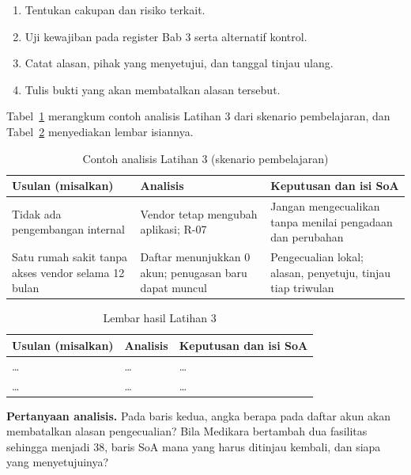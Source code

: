 \begin{enumerate}
  \item Tentukan cakupan dan risiko terkait.
  \item Uji kewajiban pada register Bab 3 serta alternatif kontrol.
  \item Catat alasan, pihak yang menyetujui, dan tanggal tinjau ulang.
  \item Tulis bukti yang akan membatalkan alasan tersebut.
\end{enumerate}

Tabel~\ref{tab:ch06-lat3-contoh} merangkum contoh analisis Latihan 3 dari skenario pembelajaran, dan
Tabel~\ref{tab:ch06-lat3-hasil} menyediakan lembar isiannya.

\begin{table}[!htb]
  \centering\small
  \caption{Contoh analisis Latihan 3 (skenario pembelajaran)}\label{tab:ch06-lat3-contoh}
  \begin{tabularx}{\textwidth}{|>{\raggedright\arraybackslash}X|>{\raggedright\arraybackslash}X|>{\raggedright\arraybackslash}X|}
    \hline
    \textbf{Usulan (misalkan)} & \textbf{Analisis} & \textbf{Keputusan dan isi SoA} \\ \hline
    Tidak ada pengembangan internal & Vendor tetap mengubah aplikasi; R-07 & Jangan mengecualikan tanpa
    menilai pengadaan dan perubahan \\ \hline
    Satu rumah sakit tanpa akses vendor selama 12 bulan & Daftar menunjukkan 0 akun; penugasan baru dapat
    muncul & Pengecualian lokal; alasan, penyetuju, tinjau tiap triwulan \\ \hline
  \end{tabularx}
\end{table}

\begin{table}[!htb]
  \centering\small
  \caption{Lembar hasil Latihan 3}\label{tab:ch06-lat3-hasil}
  \begin{tabularx}{\textwidth}{|>{\raggedright\arraybackslash}X|>{\raggedright\arraybackslash}X|>{\raggedright\arraybackslash}X|}
    \hline
    \textbf{Usulan (misalkan)} & \textbf{Analisis} & \textbf{Keputusan dan isi SoA} \\ \hline
    \dots & \dots & \dots \\ \hline
    \dots & \dots & \dots \\ \hline
  \end{tabularx}
\end{table}

\textbf{Pertanyaan analisis.} Pada baris kedua, angka berapa pada daftar akun akan membatalkan alasan
pengecualian? Bila Medikara bertambah dua fasilitas sehingga menjadi 38, baris SoA mana yang harus
ditinjau kembali, dan siapa yang menyetujuinya?
